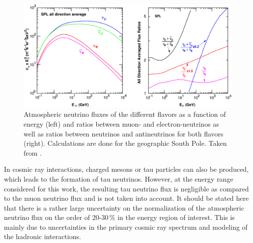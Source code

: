 \begin{figure}[h]
    \centering
    \includegraphics[width=1.0\textwidth]{figures/neutrinos_properties/Honda_alldir-spl_copy.pdf}
    \caption[Atmospheric neutrino fluxes]{Atmospheric neutrino fluxes of the different flavors as a function of energy (left) and ratios between muon- and electron-neutrinos as well as ratios between neutrinos and antineutrinos for both flavors (right). Calculations are done for the geographic South Pole. Taken from \cite{PhysRevD.92.023004_Honda_Flux}.}
\end{figure}

In cosmic ray interactions, charged mesons or tau particles can also be produced, which leads to the formation of tau neutrinos.
However, at the energy range considered for this work, the resulting tau neutrino flux is negligible as compared to the muon neutrino flux  and is not taken into account.
It should be stated here that there is a rather large uncertainty on the normalization of the atmospheric neutrino flux on the order of 20-30\,\%  in the energy region of interest.
This is mainly due to uncertainties in the primary cosmic ray spectrum and modeling of the hadronic interactions.




